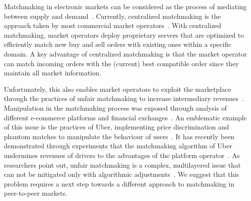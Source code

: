 Matchmaking in electronic markets can be considered as the process of mediating between supply and demand~\cite{veit2002multi}.
Currently, centralized matchmaking is the approach taken by most commercial market operators~\cite{azevedo2016,oecd2019}.
With centralized matchmaking, market operators deploy proprietary servers that are optimized to efficiently match new buy and sell orders with existing ones within a specific domain.
A key advantage of centralized matchmaking is that the market operator can match incoming orders with the (current) best compatible order since they maintain all market information.

Unfortunately, this also enables market operators to exploit the marketplace through the practices of unfair matchmaking to increase intermediary revenues~\cite{hannak2014}.
Manipulation in the matchmaking process was exposed through analysis of different e-commerce platforms and financial exchanges~\cite{oecd2019,mavroudis2019libra}.
An emblematic example of this issue is the practices of Uber, implementing price discrimination and phantom matches to manipulate the behaviour of users~\cite{calo2017taking}. %
It has recently been demonstrated through experiments that the matchmaking algorithm of Uber undermines revenues of drivers to the advantages of the platform operator~\cite{bokanyi2019ride}.
As researchers point out, unfair matchmaking is a complex, multilayered issue that can not be mitigated only with algorithmic adjustments~\cite{bokanyi2019ride}.
We suggest that this problem requires a next step towards a different approach to matchmaking in peer-to-peer markets.

